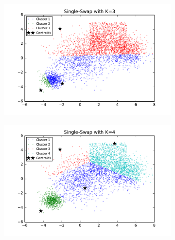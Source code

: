 \begin{description}
\begin{description}
\begin{figure}[!h]
        \centering
        \begin{subfigure}[b]{0.475\textwidth}
            \centering
            \includegraphics[width=\textwidth]{./figures/bigClustering_singleSwap_3.pdf}
        \end{subfigure}
        \hfill
        \begin{subfigure}[b]{0.475\textwidth}  
            \centering 
            \includegraphics[width=\textwidth]{./figures/bigClustering_singleSwap_4.pdf}
        \end{subfigure}
        \begin{subfigure}[b]{0.475\textwidth}  
            \centering 

\end{subfigure}
\end{figure}
\end{description}
\end{description}
